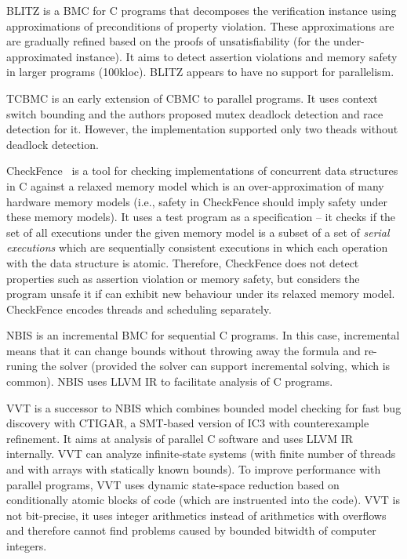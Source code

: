 BLITZ  is a BMC for C programs that decomposes the verification instance using approximations of preconditions of property violation.
These approximations are are gradually refined based on the proofs of unsatisfiability (for the under-approximated instance).
It aims to detect assertion violations and memory safety in larger programs (100kloc).
BLITZ appears to have no support for parallelism.

TCBMC  is an early extension of CBMC to parallel programs.
It uses context switch bounding and the authors proposed mutex deadlock detection and race detection for it.
However, the implementation supported only two theads without deadlock detection.

CheckFence~ is a tool for checking implementations of concurrent data structures in C against a relaxed memory model which is an over-approximation of many hardware memory models (i.e., safety in CheckFence should imply safety under these memory models).
It uses a test program as a specification -- it checks if the set of all executions under the given memory model is a subset of a set of \emph{serial executions} which are sequentially consistent executions in which each operation with the data structure is atomic.
Therefore, CheckFence does not detect properties such as assertion violation or memory safety, but considers the program unsafe it if can exhibit new behaviour under its relaxed memory model.
CheckFence encodes threads and scheduling separately.

NBIS  is an incremental BMC for sequential C programs.
In this case, incremental means that it can change bounds without throwing away the formula and re-runing the solver (provided the solver can support incremental solving, which is common).
NBIS uses LLVM IR to facilitate analysis of C programs.

VVT  is a successor to NBIS which combines bounded model checking for fast bug discovery with CTIGAR, a SMT-based version of IC3 with counterexample refinement.
It aims at analysis of parallel C software and uses LLVM IR internally.
VVT can analyze infinite-state systems (with finite number of threads and with arrays with statically known bounds).
To improve performance with parallel programs, VVT uses dynamic state-space reduction based on conditionally atomic blocks of code (which are instruented into the code).
VVT is not bit-precise, it uses integer arithmetics instead of arithmetics with overflows and therefore cannot find problems caused by bounded bitwidth of computer integers.

